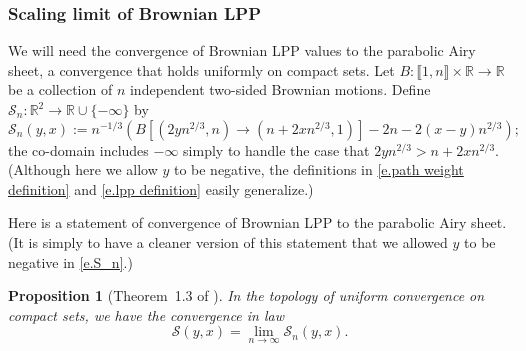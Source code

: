 \documentclass[oneside,final,11pt]{amsart}
\newtheorem{prop}[thm]{Proposition}
\theoremstyle{definition}
\newcommand{\intint}[1]{\llbracket1,#1\rrbracket}
\newcommand{\R}{\mathbb{R}}
\newcommand{\CS}{\mathcal{S}}
\renewcommand{\S}{\CS}
\newcommand{\1}[1]{\mathbf{1}_{#1}}
\newcommand{\mh}[1]{\marginnote{\tiny{\color{blue}[MH: #1]}}}
\newcommand{\red}[1]{{\color{red}#1}}
\numberwithin{equation}{section}
\begin{document}
\subsubsection{Scaling limit of Brownian LPP}\label{sec:blpp}
We will need the convergence of Brownian LPP values to the parabolic Airy sheet, a convergence that holds uniformly on compact sets. Let $B:\intint{n}\times \R\to \R$ be a collection of $n$ independent two-sided Brownian motions. Define $\S_n:\R^2\to\R\cup\{-\infty\}$ by
\begin{equation}\label{e.S_n}
\S_n(y,x) := n^{-1/3}\left(B[(2y n^{2/3},n) \to (n+2x n^{2/3}, 1)] - 2n - 2(x-y)n^{2/3}\right);
\end{equation}
%
the co-domain includes $-\infty$ simply to handle the case that $2yn^{2/3}> n+2xn^{2/3}$.
(Although here we allow $y$ to be negative, the definitions in \eqref{e.path weight definition} and \eqref{e.lpp definition} easily generalize.)

Here is a statement of convergence of Brownian LPP to the parabolic Airy sheet. (It is simply to have a cleaner version of this statement that we allowed $y$ to be negative in \eqref{e.S_n}.)

\begin{prop}[Theorem~1.3 of \cite{Landscape}]\label{t.BrLPP to Airy sheet}
In the topology of uniform convergence on compact sets, we have the convergence in law
%
\begin{equation}\label{e.para Airy BrLPP connection}
\S(y, x) = \lim_{n\to\infty} \S_n(y, x).
\end{equation}
\end{prop}
%
%
\end{document}

